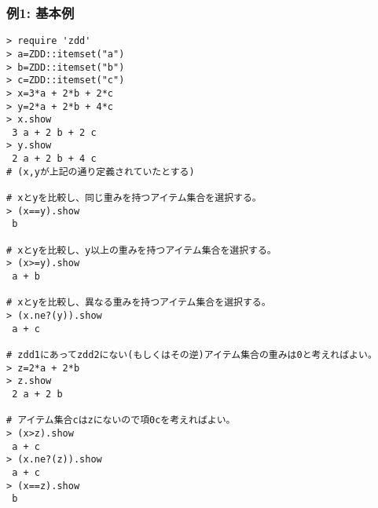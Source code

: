\subsubsection*{例1: 基本例}



\begin{Verbatim}[baselinestretch=0.7,frame=single]
> require 'zdd'
> a=ZDD::itemset("a")
> b=ZDD::itemset("b")
> c=ZDD::itemset("c")
> x=3*a + 2*b + 2*c
> y=2*a + 2*b + 4*c
> x.show
 3 a + 2 b + 2 c
> y.show
 2 a + 2 b + 4 c
# (x,yが上記の通り定義されていたとする)

# xとyを比較し、同じ重みを持つアイテム集合を選択する。
> (x==y).show
 b

# xとyを比較し、y以上の重みを持つアイテム集合を選択する。
> (x>=y).show
 a + b

# xとyを比較し、異なる重みを持つアイテム集合を選択する。
> (x.ne?(y)).show
 a + c

# zdd1にあってzdd2にない(もしくはその逆)アイテム集合の重みは0と考えればよい。
> z=2*a + 2*b
> z.show
 2 a + 2 b

# アイテム集合cはzにないので項0cを考えればよい。
> (x>z).show
 a + c
> (x.ne?(z)).show
 a + c
> (x==z).show
 b
\end{Verbatim}
